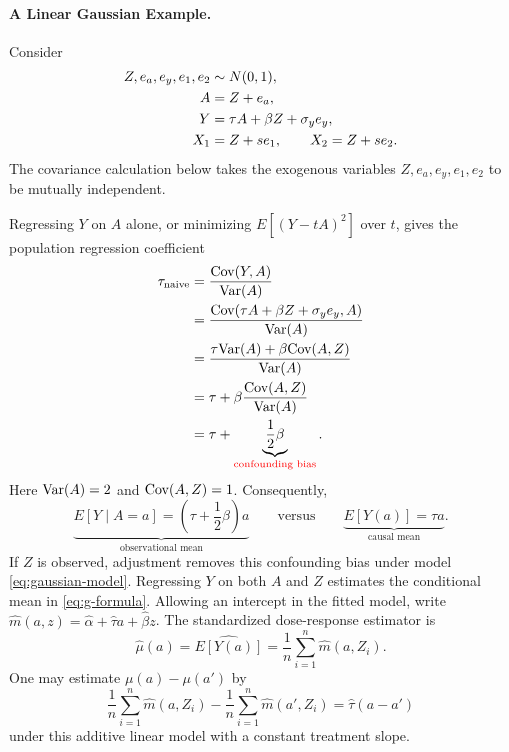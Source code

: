 \documentclass[11pt,twoside]{article}
\begin{document}
\paragraph{A Linear Gaussian Example.}
Consider
\begin{align}
\label{eq:gaussian-model}
    Z,e_a,e_y,e_1,e_2 &\sim N(0,1), \notag\\
    A &= Z+e_a, \notag\\
    Y &= \tau A+\beta Z+\sigma_y e_y, \notag\\
    X_1 &= Z+s e_1, \qquad X_2=Z+s e_2.
\end{align}
The covariance calculation below takes the exogenous variables
 $Z,e_a,e_y,e_1,e_2$ to be mutually independent.

Regressing $Y$ on $A$ alone, or minimizing $E[(Y-tA)^2]$ over $t$,
 gives the population regression coefficient
\begin{align}
\label{eq:confounding-bias}
    \tau_{\mathrm{naive}}
    &= \frac{{\mbox{Cov}}(Y,A)}{{\mbox{Var}}(A)} \notag\\
    &= \frac{{\mbox{Cov}}(\tau A+\beta Z+\sigma_y e_y,A)}{{\mbox{Var}}(A)} \notag\\
    &= \frac{\tau{\mbox{Var}}(A)+\beta{\mbox{Cov}}(A,Z)}{{\mbox{Var}}(A)} \notag\\
    &= \tau+\beta\frac{{\mbox{Cov}}(A,Z)}{{\mbox{Var}}(A)} \notag\\
    &= \tau+\underbrace{\frac{1}{2}\beta}_{\textcolor{red}{\text{confounding bias}}}.
\end{align}
Here ${\mbox{Var}}(A)=2$ and ${\mbox{Cov}}(A,Z)=1$. Consequently,
\begin{equation}
\label{eq:observational-vs-causal}
    \underbrace{E[Y\mid A=a]=\left(\tau+\frac{1}{2}\beta\right)a}
      _{\text{observational mean}}
    \qquad\text{versus}\qquad
    \underbrace{E[Y(a)]=\tau a}_{\text{causal mean}}.
\end{equation}
If $Z$ is observed, adjustment removes this confounding bias under model \eqref{eq:gaussian-model}. Regressing $Y$ on both $A$ and $Z$ estimates the conditional mean in \eqref{eq:g-formula}. Allowing an intercept in the fitted model, write $\hat m(a,z)=\hat\alpha+\hat\tau a+\hat\beta z$. The standardized dose-response estimator is
\[
\hat{\mu}(a) = \widehat{E[Y(a)]} = \frac{1}{n}\sum_{i=1}^n\hat{m}(a, Z_i).
\]
One may estimate $\mu(a)-\mu(a')$ by
\[
\frac{1}{n}\sum_{i=1}^n\hat{m}(a, Z_i) - \frac{1}{n}\sum_{i=1}^n\hat{m}(a', Z_i) = \hat{\tau}(a-a')
\]
under this additive linear model with a constant treatment slope.
\end{document}
